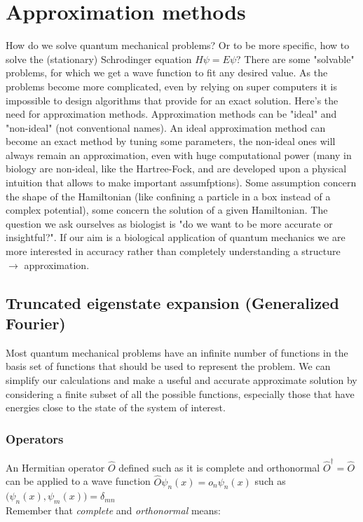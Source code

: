 \graphicspath{{chapters/05/}}
\chapter{Approximation methods}
How do we solve quantum mechanical problems? Or to be more specific, how to solve the (stationary) Schrodinger equation $ H \psi = E \psi$? There are some "solvable" problems, for which we get a wave function to fit any desired value.
As the problems become more complicated, even by relying on super computers it is impossible to design algorithms that provide for an exact solution.
Here's the need for approximation methods.
Approximation methods can be "ideal" and "non-ideal" (not conventional names).
An ideal approximation method can become an exact method by tuning some parameters, the non-ideal ones will always remain an approximation, even with huge computational power (many in biology are non-ideal, like the Hartree-Fock, and are developed upon a physical intuition that allows to make important assumfptions).
Some assumption concern the shape of the Hamiltonian (like confining a particle in a box instead of a complex potential), some concern the solution of a given Hamiltonian.
The question we ask ourselves as biologist is "do we want to be more accurate or insightful?".
If our aim is a biological application of quantum mechanics we are more interested in accuracy rather than completely understanding a structure $\rightarrow$ approximation.

\section{Truncated eigenstate expansion (Generalized Fourier)}
Most quantum mechanical problems have an infinite number of functions in the basis set of functions that should be used to represent the problem.
We can simplify our calculations and make a useful and accurate approximate solution by considering a finite subset of all the possible functions, especially those that have energies close to the state of the system of interest.

	\subsection{Operators}
	An Hermitian operator $\hat{O}$ defined such as it is complete and orthonormal $\hat{O}^\dagger=\hat{O}$ can be applied to a wave function $\hat{O}\psi_n(x)=o_n\psi_n(x)$ such as $\bigl(\psi_n(x),\psi_m(x)\bigr)=\delta_{mn}$\\
	Remember that \textit{complete} and \textit{orthonormal} means:

